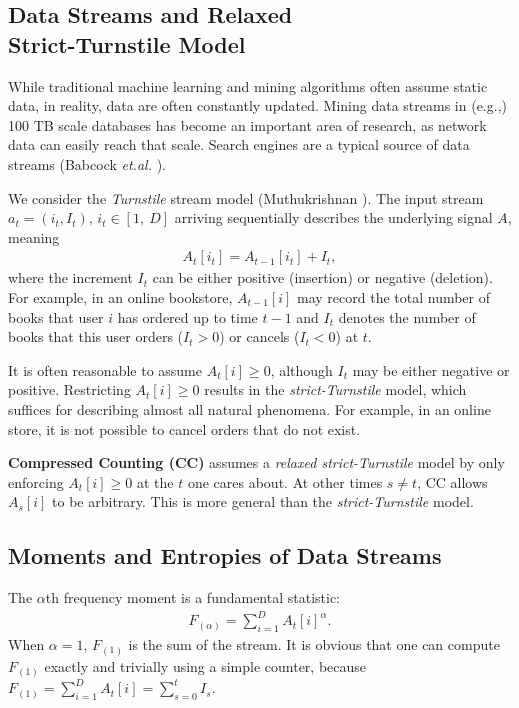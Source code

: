\documentclass{sig-alternate}
\begin{document}
\subsection{Data Streams and Relaxed\\ Strict-Turnstile Model}

While traditional machine learning and mining algorithms often assume static data, in reality, data are often constantly updated. Mining data streams\cite{Book:Henzinger_99,Proc:Babcock_PODS02,Proc:Aggarwal_KDD04,Article:Muthukrishnan_05} in (e.g.,) 100 TB scale  databases has become an important area of research, as network data can easily reach that scale\cite{Article:ICDM10}. Search engines are a typical source of data streams (Babcock {\em et.al.} \cite{Proc:Babcock_PODS02}).

We consider the  {\em Turnstile}  stream model (Muthukrishnan \cite{Article:Muthukrishnan_05}). The input  stream $a_t = (i_t, I_t)$, $i_t\in [1,\ D]$ arriving sequentially describes the underlying signal $A$, meaning
\begin{align}\label{eqn_Turnstile}
A_t[i_t] = A_{t-1}[i_t] + I_t,
\end{align} where the increment $I_t$ can be either positive (insertion) or negative (deletion). For example, in an online bookstore, $A_{t-1}[i]$ may record the total number of books that user $i$ has ordered up to time $t-1$ and $I_t$ denotes the number of books that this user orders ($I_t>0$) or cancels ($I_t<0$) at  $t$.

It is often reasonable to assume $A_t[i]\geq 0$, although $I_t$ may be either negative or positive. Restricting $A_t[i]\geq 0$ results in the {\em strict-Turnstile} model, which suffices for describing almost all natural phenomena. For example, in an online store, it is  not possible to cancel orders that do not exist.

\textbf{Compressed Counting (CC)} assumes a {\em relaxed strict-Turnstile} model by only enforcing $A_t[i]\geq0$ at the $t$ one cares about.  At other times $s \neq t$,  CC allows $A_s[i]$ to be arbitrary. This is more general than the {\em strict-Turnstile} model.




\subsection{Moments and Entropies of Data Streams}

The $\alpha$th frequency moment is a fundamental statistic:
\begin{align}
F_{(\alpha)} = \sum_{i=1}^D A_t[i]^\alpha.
 \end{align}
\noindent When $\alpha = 1$, $F_{(1)}$ is the sum of the stream. It is obvious that one can compute $F_{(1)}$ exactly and trivially using a simple counter, because $F_{(1)} = \sum_{i=1}^D A_t[i] = \sum_{s=0}^t I_s$.
\end{document}
